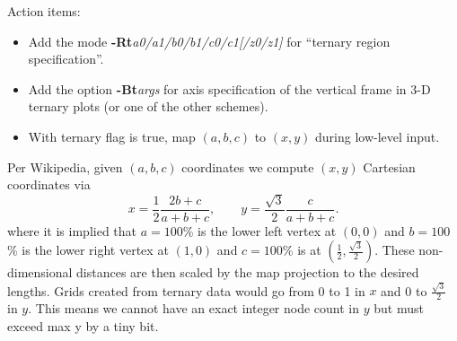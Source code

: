 \documentclass[12pt,letterpaper,margin=0.5in]{report}
\begin{document}
Action items:
\begin{itemize}
\item Add the mode {\bf -Rt}{\it a0/a1/b0/b1/c0/c1[/z0/z1]} for ``ternary region specification''.
\item Add the option {\bf -Bt}{\it args} for axis specification of the vertical frame in 3-D ternary plots (or one of the other schemes).
\item With ternary flag is true, map $(a,b,c)$ to $(x,y)$ during low-level input.
\end{itemize}
Per Wikipedia, given  $(a,b,c)$ coordinates we compute $(x,y)$ Cartesian coordinates via
\begin{equation}
	x = \frac{1}{2}\frac{2b+c}{a+b+c}, \quad \quad y = \frac{\sqrt{3}}{2}\frac{c}{a+b+c}.
\end{equation}
where it is implied that $a = 100$\% is the lower left vertex at $(0,0)$ and $b = 100$\% is the lower right vertex at $(1,0)$ and
$c = 100$\% is at $(\frac{1}{2}, \frac{\sqrt{3}}{2})$.  These non-dimensional distances are then scaled by the map projection
to the desired lengths.  Grids created from ternary data would go from 0 to 1 in $x$ and 0 to $\frac{\sqrt{3}}{2}$ in $y$. This
means we cannot have an exact integer node count in $y$ but must exceed max y by a tiny bit.
\end{document}
